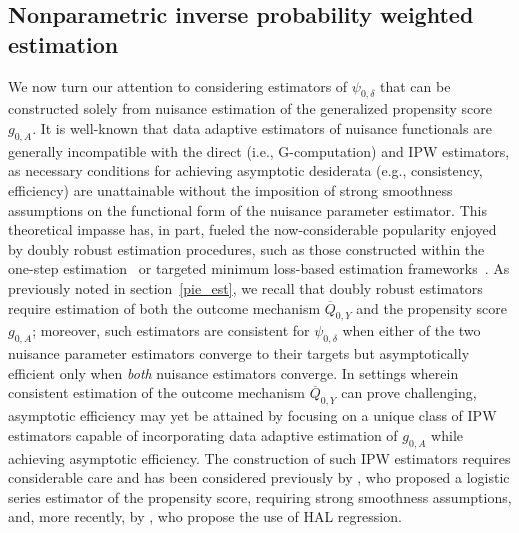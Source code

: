 \subsection{Nonparametric inverse probability weighted estimation}\label{npipw}

We now turn our attention to considering estimators of $\psi_{0,\delta}$ that
can be constructed solely from nuisance estimation of the generalized propensity
score $g_{0,A}$. It is well-known that data adaptive estimators of nuisance
functionals are generally incompatible with the direct (i.e., G-computation) and
IPW estimators, as necessary conditions for achieving asymptotic desiderata
(e.g., consistency, efficiency) are unattainable without the imposition of
strong smoothness assumptions on the functional form of the nuisance parameter
estimator. This theoretical impasse has, in part, fueled the now-considerable
popularity enjoyed by doubly robust estimation procedures, such as those
constructed within the one-step estimation~\citep{bickel1993efficient} or
targeted minimum loss-based estimation frameworks~\citep{vdl2006targeted,
vdl2011targeted,vdl2018targeted}. As previously noted in section~\ref{pie_est},
we recall that doubly robust estimators require estimation of both the outcome
mechanism $\overline{Q}_{0,Y}$ and the propensity score $g_{0,A}$; moreover,
such estimators are consistent for $\psi_{0,\delta}$ when either of the two
nuisance parameter estimators converge to their targets but asymptotically
efficient only when \textit{both} nuisance estimators converge. In settings
wherein consistent estimation of the outcome mechanism $\overline{Q}_{0,Y}$ can
prove challenging, asymptotic efficiency may yet be attained by focusing on a
unique class of IPW estimators capable of incorporating data adaptive estimation
of $g_{0,A}$ while achieving asymptotic efficiency. The construction of such IPW
estimators requires considerable care and has been considered previously by
\citet{hirano2003efficient}, who proposed a logistic series estimator of the
propensity score, requiring strong smoothness assumptions, and, more recently,
by \citet{ertefaie2020nonparametric}, who propose the use of HAL regression.

